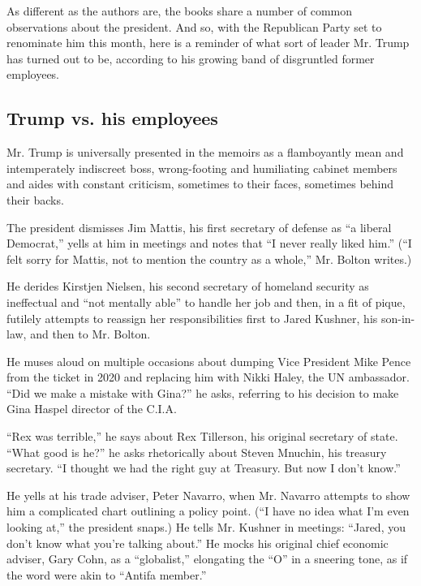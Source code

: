 As different as the authors are, the books share a number of common
observations about the president. And so, with the Republican Party set
to renominate him this month, here is a reminder of what sort of leader
Mr. Trump has turned out to be, according to his growing band of
disgruntled former employees.

\hypertarget{trump-vs-his-employees}{%
\subsection{Trump vs. his employees}\label{trump-vs-his-employees}}

Mr. Trump is universally presented in the memoirs as a flamboyantly mean
and intemperately indiscreet boss, wrong-footing and humiliating cabinet
members and aides with constant criticism, sometimes to their faces,
sometimes behind their backs.

The president dismisses Jim Mattis, his first secretary of defense as
``a liberal Democrat,'' yells at him in meetings and notes that ``I
never really liked him.'' (``I felt sorry for Mattis, not to mention the
country as a whole,'' Mr. Bolton writes.)

He derides Kirstjen Nielsen, his second secretary of homeland security
as ineffectual and ``not mentally able'' to handle her job and then, in
a fit of pique, futilely attempts to reassign her responsibilities first
to Jared Kushner, his son-in-law, and then to Mr. Bolton.

He muses aloud on multiple occasions about dumping Vice President Mike
Pence from the ticket in 2020 and replacing him with Nikki Haley, the UN
ambassador. ``Did we make a mistake with Gina?'' he asks, referring to
his decision to make Gina Haspel director of the C.I.A.

``Rex was terrible,'' he says about Rex Tillerson, his original
secretary of state. ``What good is he?'' he asks rhetorically about
Steven Mnuchin, his treasury secretary. ``I thought we had the right guy
at Treasury. But now I don't know.''

He yells at his trade adviser, Peter Navarro, when Mr. Navarro attempts
to show him a complicated chart outlining a policy point. (``I have no
idea what I'm even looking at,'' the president snaps.) He tells Mr.
Kushner in meetings: ``Jared, you don't know what you're talking
about.'' He mocks his original chief economic adviser, Gary Cohn, as a
``globalist,'' elongating the ``O'' in a sneering tone, as if the word
were akin to ``Antifa member.''

